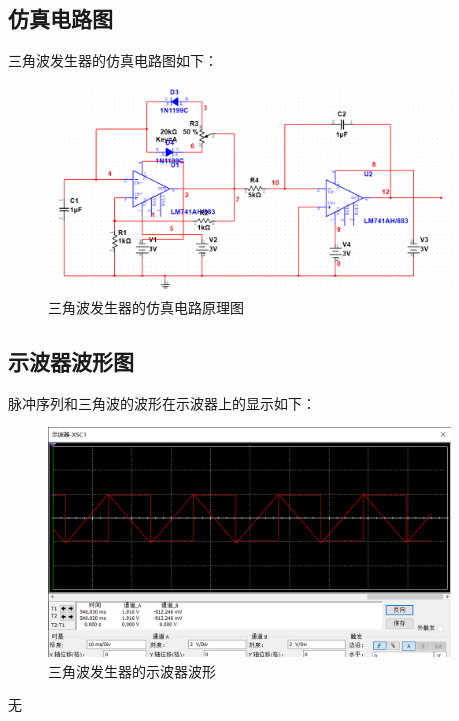 \documentclass[UTF8]{ctexart}
\begin{document}
\subsection{仿真电路图}

三角波发生器的仿真电路图如下：
\begin{figure}[H]
\centering
\includegraphics[width=0.95\textwidth]{E.png}
\caption{三角波发生器的仿真电路原理图}
\end{figure}
\subsection{示波器波形图}
脉冲序列和三角波的波形在示波器上的显示如下：
\begin{figure}[H]
\centering
\includegraphics[width=0.95\textwidth]{F.png}
\caption{三角波发生器的示波器波形}
\end{figure}


\begin{thebibliography}{123456} 
 无
\end{thebibliography}
\end{document}
